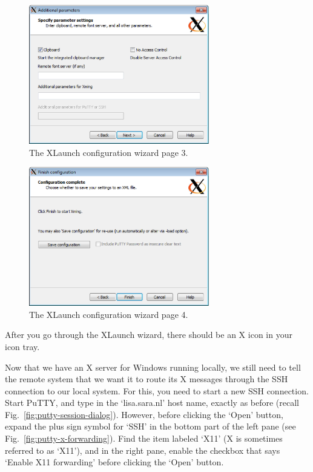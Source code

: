 \begin{figure}[H]
  \centering
    \includegraphics[width=0.7\textwidth]{./../eps/xlaunch-4.eps}
  \caption{The XLaunch configuration wizard page 3.}
  \label{fig:xlaunch-3}
\end{figure}

\begin{figure}[H]
  \centering
    \includegraphics[width=0.7\textwidth]{./../eps/xlaunch-5.eps}
  \caption{The XLaunch configuration wizard page 4.}
  \label{fig:xlaunch-4}
\end{figure}



After you go through the XLaunch wizard, there should be an X icon in your icon tray.

Now that we have an X server for Windows running locally, we still need to tell the remote system that we want it to route its X messages through the SSH connection to our local system. For this, you need to start a new SSH connection. Start PuTTY, and type in the `lisa.sara.nl' host name, exactly as before (recall Fig.~\ref{fig:putty-session-dialog}). However, before clicking the `Open' button, expand the plus sign symbol for `SSH' in the bottom part of the left pane (see Fig.~\ref{fig:putty-x-forwarding}). Find the item labeled `X11' (X is sometimes referred to as `X11'), and in the right pane, enable the checkbox that says `Enable X11 forwarding' before clicking the `Open' button.


